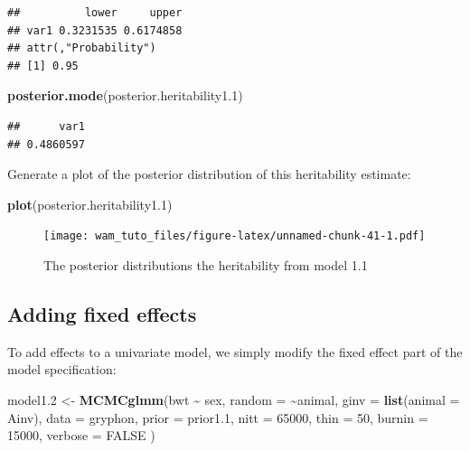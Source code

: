\documentclass[
  12pt,
]{book}
\newenvironment{Shaded}{\begin{snugshade}}{\end{snugshade}}
\newcommand{\DataTypeTok}[1]{\textcolor[rgb]{0.13,0.29,0.53}{#1}}
\newcommand{\DecValTok}[1]{\textcolor[rgb]{0.00,0.00,0.81}{#1}}
\newcommand{\FloatTok}[1]{\textcolor[rgb]{0.00,0.00,0.81}{#1}}
\newcommand{\KeywordTok}[1]{\textcolor[rgb]{0.13,0.29,0.53}{\textbf{#1}}}
\newcommand{\NormalTok}[1]{#1}
\newcommand{\OperatorTok}[1]{\textcolor[rgb]{0.81,0.36,0.00}{\textbf{#1}}}
\newcommand{\OtherTok}[1]{\textcolor[rgb]{0.56,0.35,0.01}{#1}}
\newcommand{\StringTok}[1]{\textcolor[rgb]{0.31,0.60,0.02}{#1}}
\begin{document}
\begin{verbatim}
##          lower     upper
## var1 0.3231535 0.6174858
## attr(,"Probability")
## [1] 0.95
\end{verbatim}

\begin{Shaded}
\begin{Highlighting}[]
\KeywordTok{posterior.mode}\NormalTok{(posterior.heritability1}\FloatTok{.1}\NormalTok{)}
\end{Highlighting}
\end{Shaded}

\begin{verbatim}
##      var1 
## 0.4860597
\end{verbatim}

Generate a plot of the posterior distribution of this heritability estimate:

\begin{Shaded}
\begin{Highlighting}[]
\KeywordTok{plot}\NormalTok{(posterior.heritability1}\FloatTok{.1}\NormalTok{)}
\end{Highlighting}
\end{Shaded}

\begin{figure}
\centering
\texttt{[image: wam\_tuto\_files/figure-latex/unnamed-chunk-41-1.pdf]}
\caption{\label{fig:unnamed-chunk-41}The posterior distributions the heritability from model 1.1}
\end{figure}

\hypertarget{adding-fixed-effects-1}{%
\subsection{Adding fixed effects}\label{adding-fixed-effects-1}}

To add effects to a univariate model, we simply modify the fixed effect part of the model specification:

\begin{Shaded}
\begin{Highlighting}[]
\NormalTok{model1}\FloatTok{.2}\NormalTok{ \textless{}{-}}\StringTok{ }\KeywordTok{MCMCglmm}\NormalTok{(bwt }\OperatorTok{\textasciitilde{}}\StringTok{ }\NormalTok{sex,}
  \DataTypeTok{random =} \OperatorTok{\textasciitilde{}}\NormalTok{animal, }\DataTypeTok{ginv =} \KeywordTok{list}\NormalTok{(}\DataTypeTok{animal =}\NormalTok{ Ainv),}
  \DataTypeTok{data =}\NormalTok{ gryphon, }\DataTypeTok{prior =}\NormalTok{ prior1}\FloatTok{.1}\NormalTok{,}
  \DataTypeTok{nitt =} \DecValTok{65000}\NormalTok{, }\DataTypeTok{thin =} \DecValTok{50}\NormalTok{, }\DataTypeTok{burnin =} \DecValTok{15000}\NormalTok{, }\DataTypeTok{verbose =} \OtherTok{FALSE}
\NormalTok{)}
\end{Highlighting}
\end{Shaded}
\end{document}
